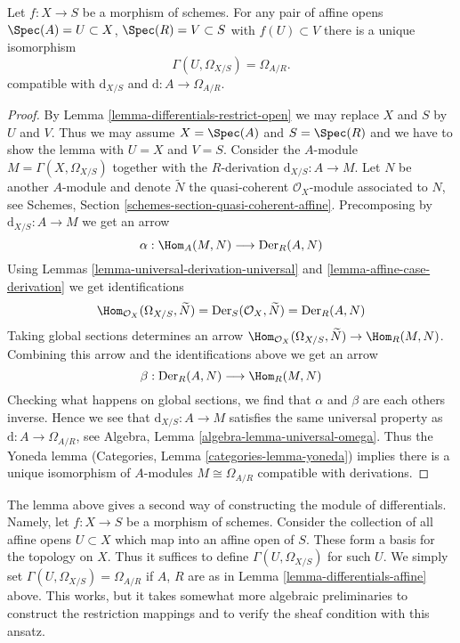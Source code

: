 \begin{lemma}
\label{lemma-differentials-affine}
Let $f : X \to S$ be a morphism of schemes. For any pair of affine opens
$\Spec(A) = U \subset X$, $\Spec(R) = V \subset S$ with $f(U) \subset V$
there is a unique isomorphism
$$
\Gamma(U, \Omega_{X/S}) = \Omega_{A/R}.
$$
compatible with $\text{d}_{X/S}$ and $\text{d} : A \to \Omega_{A/R}$.
\end{lemma}

\begin{proof}
By Lemma \ref{lemma-differentials-restrict-open} we may replace
$X$ and $S$ by $U$ and $V$. Thus we may assume $X = \Spec(A)$
and $S = \Spec(R)$ and we have to show the lemma with $U = X$
and $V = S$. Consider the $A$-module $M = \Gamma(X, \Omega_{X/S})$
together with the $R$-derivation $\text{d}_{X/S} : A \to M$.
Let $N$ be another $A$-module and denote $\widetilde{N}$ the quasi-coherent
$\mathcal{O}_X$-module associated to $N$, see
Schemes, Section \ref{schemes-section-quasi-coherent-affine}.
Precomposing by $\text{d}_{X/S} : A \to M$ we get an arrow
$$
\alpha : \Hom_A(M, N) \longrightarrow \text{Der}_R(A, N)
$$
Using Lemmas \ref{lemma-universal-derivation-universal} and
\ref{lemma-affine-case-derivation} we get identifications
$$
\Hom_{\mathcal{O}_X}(\Omega_{X/S}, \widetilde{N}) =
\text{Der}_S(\mathcal{O}_X, \widetilde{N}) =
\text{Der}_R(A, N)
$$
Taking global sections determines an arrow
$\Hom_{\mathcal{O}_X}(\Omega_{X/S}, \widetilde{N}) \to \Hom_R(M, N)$.
Combining this arrow and the identifications above we get an arrow
$$
\beta : \text{Der}_R(A, N) \longrightarrow \Hom_R(M, N)
$$
Checking what happens on global sections, we find that $\alpha$
and $\beta$ are each others inverse. Hence we see that
$\text{d}_{X/S} : A \to M$ satisfies
the same universal property as $\text{d} : A \to \Omega_{A/R}$,
see Algebra, Lemma \ref{algebra-lemma-universal-omega}. Thus the Yoneda lemma
(Categories, Lemma \ref{categories-lemma-yoneda})
implies there is a unique isomorphism of $A$-modules
$M \cong \Omega_{A/R}$ compatible with derivations.
\end{proof}

\begin{remark}
\label{remark-differentials-glue}
The lemma above gives a second way of constructing the module of
differentials. Namely, let $f : X \to S$ be a morphism of schemes.
Consider the collection of all affine opens $U \subset X$ which
map into an affine open of $S$. These form a basis for the topology
on $X$. Thus it suffices to define $\Gamma(U, \Omega_{X/S})$
for such $U$. We simply set $\Gamma(U, \Omega_{X/S}) = \Omega_{A/R}$ if
$A$, $R$ are as in Lemma \ref{lemma-differentials-affine} above.
This works, but it takes somewhat more algebraic preliminaries
to construct the restriction mappings and to verify the sheaf
condition with this ansatz.
\end{remark}

